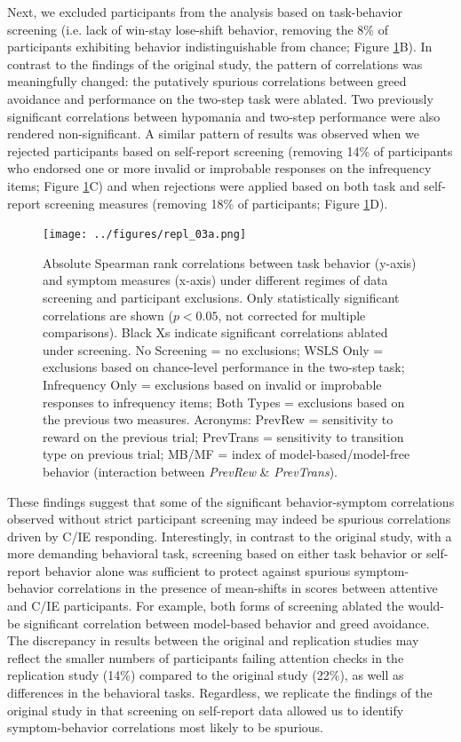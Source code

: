 \documentclass[a4paper,notitlepage,12pt]{article}
\begin{document}
\begin{refsection}[supp]
Next, we excluded participants from the analysis based on task-behavior screening (i.e. lack of win-stay lose-shift behavior, removing the 8\% of participants exhibiting behavior indistinguishable from chance; Figure \ref{fig:repl_correlations}B). In contrast to the findings of the original study, the pattern of correlations was meaningfully changed: the putatively spurious correlations between greed avoidance and performance on the two-step task were ablated. Two previously significant correlations between hypomania and two-step performance were also rendered non-significant. A similar pattern of results was observed when we rejected participants based on self-report screening (removing 14\% of participants who endorsed one or more invalid or improbable responses on the infrequency items; Figure \ref{fig:repl_correlations}C) and when rejections were applied based on both task and self-report screening measures (removing 18\% of participants; Figure \ref{fig:repl_correlations}D).

\begin{figure}[!t]
\texttt{[image: ../figures/repl\_03a.png]}
\centering
\captionsetup{width=0.88\textwidth}
\caption{Absolute Spearman rank correlations between task behavior (y-axis) and symptom measures (x-axis) under different regimes of data screening and participant exclusions. Only statistically significant correlations are shown ($p<0.05$, not corrected for multiple comparisons). Black Xs indicate significant correlations ablated under screening. No Screening = no exclusions; WSLS Only = exclusions based on chance-level performance in the two-step task; Infrequency Only = exclusions based on invalid or improbable responses to infrequency items; Both Types = exclusions based on the previous two measures. Acronyms: PrevRew = sensitivity to reward on the previous trial; PrevTrans = sensitivity to transition type on previous trial; MB/MF = index of model-based/model-free behavior (interaction between \textit{PrevRew} \& \textit{PrevTrans}).}
\label{fig:repl_correlations}
\end{figure}

These findings suggest that some of the significant behavior-symptom correlations observed without strict participant screening may indeed be spurious correlations driven by C/IE responding. Interestingly, in contrast to the original study, with a more demanding behavioral task, screening based on either task behavior or self-report behavior alone was sufficient to protect against spurious symptom-behavior correlations in the presence of mean-shifts in scores between attentive and C/IE participants. For example, both forms of screening ablated the would-be significant correlation between model-based behavior and greed avoidance. The discrepancy in results between the original and replication studies may reflect the smaller numbers of participants failing attention checks in the replication study (14\%) compared to the original study (22\%), as well as differences in the behavioral tasks. Regardless, we replicate the findings of the original study in that screening on self-report data allowed us to identify symptom-behavior correlations most likely to be spurious.


\end{refsection}
\end{document}
